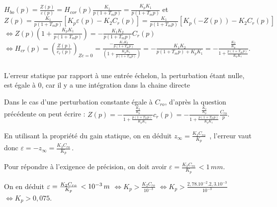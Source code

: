 \ifprof
\newpage
\begin{multicols}{2}
\setcounter{exo}{0}

\subparagraph{}\textit{}%


${H_{bo}}(p) = \frac{{Z(p)}}{{\varepsilon (p)}} = {H_{cor}}(p)\frac{{{K_1}}}{{p(1 + {T_m}p)}} = \frac{{{K_p}{K_1}}}{{p(1 + {T_m}p)}}$
et $Z(p) = \frac{{{K_1}}}{{p(1 + {T_m}p)}}\left[ {{K_p}\varepsilon (p) - {K_2}{C_r}(p)} \right] = \frac{{{K_1}}}{{p(1 + {T_m}p)}}\left[ {{K_p}( - Z(p)) - {K_2}{C_r}(p)} \right]$
$\Leftrightarrow 
Z(p)(1 + \frac{{{K_p}{K_1}}}{{p(1 + {T_m}p)}}) =  - \frac{{{K_1}{K_2}}}{{p(1 + {T_m}p)}}{C_r}(p)$
$\Leftrightarrow 
{H_{cr}}(p) = {\left( {\frac{{Z(p)}}{{{c_r}(p)}}} \right)_{Zc = 0}} = \frac{{ - \frac{{{K_1}{K_2}}}{{p(1 + {T_m}p)}}}}{{(1 + \frac{{{K_p}{K_1}}}{{p(1 + {T_m}p)}})}} =  - \frac{{{K_1}{K_2}}}{{p(1 + {T_m}p) + {K_p}{K_1}}} =  - \frac{{\frac{{{K_2}}}{{{K_p}}}}}{{1 + \frac{{p(1 + {T_m}p)}}{{{K_p}{K_1}}}}}$.

\subparagraph{}\textit{}%

L'erreur statique par rapport  à une entrée échelon, la perturbation étant nulle, est égale à 0, car il y a une intégration dans la chaine directe

Dans le cas d'une perturbation constante égale à $C_{ro}$, d'après la question précédente on peut écrire :  
$
Z(p) =  - \frac{{\frac{{{K_2}}}{{{K_p}}}}}{{1 + \frac{{p(1 + {T_m}p)}}{{{K_p}{K_1}}}}}{c_r}(p) = - \frac{{\frac{{{K_2}}}{{{K_p}}}}}{{1 + \frac{{p(1 + {T_m}p)}}{{{K_p}{K_1}}}}}\frac{{{C_{ro}}}}{p}$.

En utilisant la propriété du gain statique, on en déduit ${z_\infty } =  \frac{{{K_2}{C_{ro}}}}{{{K_p}}}\,$ , l'erreur vaut donc  $\varepsilon  =  -{z_\infty }= \frac{{{K_2}{C_{ro}}}}{{{K_p}}}\,$.

Pour répondre à l'exigence de précision, on doit avoir $\varepsilon  = \frac{{{K_2}{C_{ro}}}}{{{K_p}}}\, < 1\,mm$.

On en déduit $
\varepsilon  =  \frac{{{K_2}{C_{ro}}}}{{{K_p}}}\, < {10^{ - 3}}\,m\\$
$\Leftrightarrow {K_p} > \frac{{{K_2}{C_{ro}}}}{{{{10}^{ - 3}}}}$
$\Leftrightarrow {K_p} > \frac{{{{2,78.10}^{ - 2}}{{.2,3.10}^{ - 3}}}}{{{{10}^{ - 3}}}}$
$\Leftrightarrow 
{K_p} > 0,075$.





\end{multicols}
